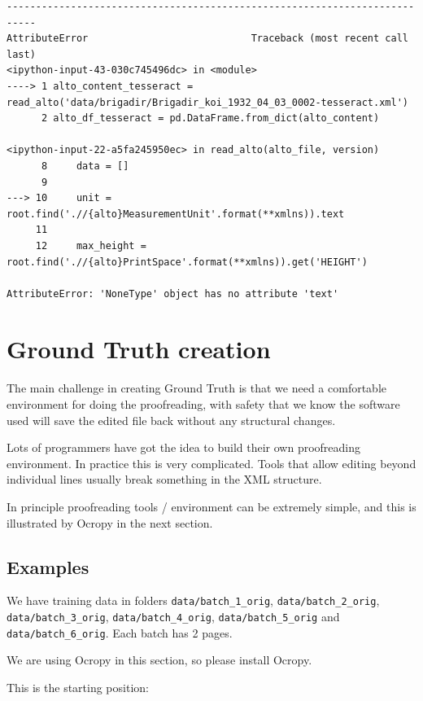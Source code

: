 \documentclass[]{book}
\begin{document}
\begin{verbatim}
---------------------------------------------------------------------------
AttributeError                            Traceback (most recent call last)
<ipython-input-43-030c745496dc> in <module>
----> 1 alto_content_tesseract = read_alto('data/brigadir/Brigadir_koi_1932_04_03_0002-tesseract.xml')
      2 alto_df_tesseract = pd.DataFrame.from_dict(alto_content)

<ipython-input-22-a5fa245950ec> in read_alto(alto_file, version)
      8     data = []
      9 
---> 10     unit = root.find('.//{alto}MeasurementUnit'.format(**xmlns)).text
     11 
     12     max_height = root.find('.//{alto}PrintSpace'.format(**xmlns)).get('HEIGHT')

AttributeError: 'NoneType' object has no attribute 'text'
\end{verbatim}

\hypertarget{ground-truth}{%
\chapter{Ground Truth creation}\label{ground-truth}}

The main challenge in creating Ground Truth is that we need a comfortable environment for doing the proofreading, with safety that we know the software used will save the edited file back without any structural changes.

Lots of programmers have got the idea to build their own proofreading environment. In practice this is very complicated. Tools that allow editing beyond individual lines usually break something in the XML structure.

In principle proofreading tools / environment can be extremely simple, and this is illustrated by Ocropy in the next section.

\hypertarget{examples}{%
\section{Examples}\label{examples}}

We have training data in folders \texttt{data/batch\_1\_orig}, \texttt{data/batch\_2\_orig}, \texttt{data/batch\_3\_orig}, \texttt{data/batch\_4\_orig}, \texttt{data/batch\_5\_orig} and \texttt{data/batch\_6\_orig}. Each batch has 2 pages.

We are using Ocropy in this section, so please install Ocropy.

This is the starting position:
\end{document}
